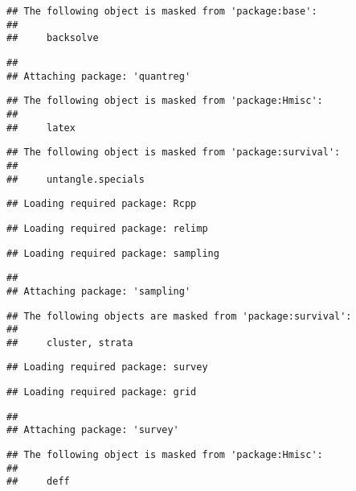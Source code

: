 \documentclass[11pt,]{article}
\begin{document}
\begin{verbatim}
## The following object is masked from 'package:base':
## 
##     backsolve
\end{verbatim}

\begin{verbatim}
## 
## Attaching package: 'quantreg'
\end{verbatim}

\begin{verbatim}
## The following object is masked from 'package:Hmisc':
## 
##     latex
\end{verbatim}

\begin{verbatim}
## The following object is masked from 'package:survival':
## 
##     untangle.specials
\end{verbatim}

\begin{verbatim}
## Loading required package: Rcpp
\end{verbatim}

\begin{verbatim}
## Loading required package: relimp
\end{verbatim}

\begin{verbatim}
## Loading required package: sampling
\end{verbatim}

\begin{verbatim}
## 
## Attaching package: 'sampling'
\end{verbatim}

\begin{verbatim}
## The following objects are masked from 'package:survival':
## 
##     cluster, strata
\end{verbatim}

\begin{verbatim}
## Loading required package: survey
\end{verbatim}

\begin{verbatim}
## Loading required package: grid
\end{verbatim}

\begin{verbatim}
## 
## Attaching package: 'survey'
\end{verbatim}

\begin{verbatim}
## The following object is masked from 'package:Hmisc':
## 
##     deff
\end{verbatim}
\end{document}
